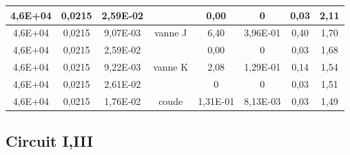 \documentclass[12pt, a4paper, twoside]{article} %
\begin{document}
\begin{landscape}
\begin{table}[h]
\begin{tabular}{|c|c|c|c|c|c|c|c|}
    \hline
    4,6E+04 & 0,0215 & 2,59E-02 & \cellcolor[rgb]{ .576,  .769,  .49} & 0,00   & 0      & 0,03   & 2,11 \\
    \hline
    4,6E+04 & 0,0215 & 9,07E-03 & \cellcolor[rgb]{ .576,  .769,  .49}vanne J & 6,40   & 3,96E-01 & 0,40   & 1,70 \\
    \hline
    4,6E+04 & 0,0215 & 2,59E-02 & \cellcolor[rgb]{ .576,  .769,  .49} & 0,00   & 0      & 0,03   & 1,68 \\
    \hline
    4,6E+04 & 0,0215 & 9,22E-03 & \cellcolor[rgb]{ .576,  .769,  .49}vanne K & 2,08   & 1,29E-01 & 0,14   & 1,54 \\
    \hline
    4,6E+04 & 0,0215 & 2,61E-02 & \cellcolor[rgb]{ .576,  .769,  .49} & 0      & 0      & 0,03   & 1,51 \\
    \hline
    4,6E+04 & 0,0215 & 1,76E-02 & \cellcolor[rgb]{ .576,  .769,  .49}coude & 1,31E-01 & 8,13E-03 & 0,03   & 1,49 \\
    \hline
    \end{tabular}%
  \label{tab:Valeurs_theo_II}%
\end{table}%
\end{landscape}

\clearpage
\subsection{Circuit I,III }
\label{Annexe:Données et valeurs calculer, circuit I,III}
\end{document}
